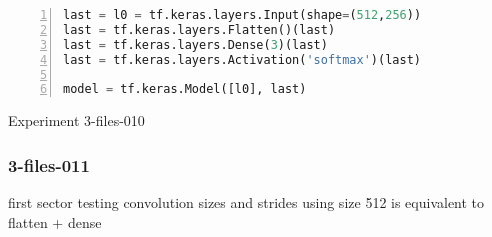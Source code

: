 


\noindent
\begin{algorithm}
\begin{lstlisting}[language=Python, frame=single, numbers=left]
last = l0 = tf.keras.layers.Input(shape=(512,256))
last = tf.keras.layers.Flatten()(last)
last = tf.keras.layers.Dense(3)(last)
last = tf.keras.layers.Activation('softmax')(last)

model = tf.keras.Model([l0], last)
\end{lstlisting}
\caption{\label{alg:3-files-010}Experiment 3-files-010}
\end{algorithm}

\subsubsection{3-files-011}


first sector
testing convolution sizes and strides
using size 512 is equivalent to flatten + dense


